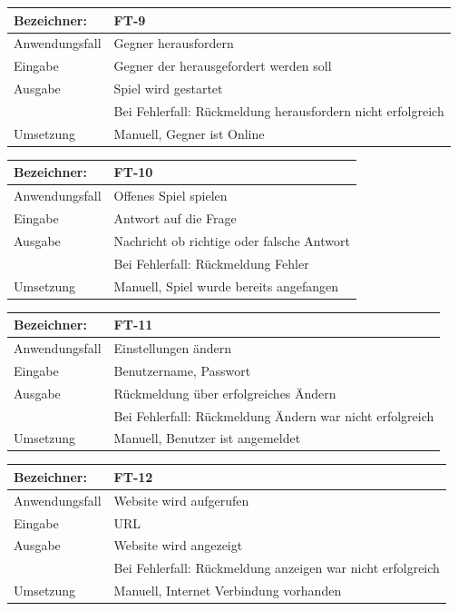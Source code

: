 \documentclass[fontsize=12pt,paper=a4,twoside]{scrartcl}
\begin{document}
\begin{tabular}{|l|p{13.75cm}|}
\hline
	Bezeichner: & FT-9\\
\hline
	Anwendungsfall & Gegner herausfordern\\
\hline
	Eingabe & Gegner der herausgefordert werden soll\\
\hline
	Ausgabe & Spiel wird gestartet\\ &
	Bei Fehlerfall: Rückmeldung herausfordern nicht erfolgreich\\
\hline
	Umsetzung & Manuell, Gegner ist Online\\
\hline
\end{tabular}

\begin{tabular}{|l|p{13.75cm}|}
\hline
	Bezeichner: & FT-10\\
\hline
	Anwendungsfall & Offenes Spiel spielen\\
\hline
	Eingabe & Antwort auf die Frage\\
\hline
	Ausgabe & Nachricht ob richtige oder falsche Antwort\\ &
	Bei Fehlerfall: Rückmeldung Fehler\\
\hline
	Umsetzung & Manuell, Spiel wurde bereits angefangen\\
\hline
\end{tabular}

\begin{tabular}{|l|p{13.75cm}|}
\hline
	Bezeichner: & FT-11\\
\hline
	Anwendungsfall & Einstellungen ändern\\
\hline
	Eingabe & Benutzername, Passwort\\
\hline
	Ausgabe & Rückmeldung über erfolgreiches Ändern\\ &
	Bei Fehlerfall: Rückmeldung Ändern war nicht erfolgreich\\
\hline
	Umsetzung & Manuell, Benutzer ist angemeldet\\
\hline
\end{tabular}

\begin{tabular}{|l|p{13.75cm}|}
\hline
	Bezeichner: & FT-12\\
\hline
	Anwendungsfall & Website wird aufgerufen\\
\hline
	Eingabe & URL\\
\hline
	Ausgabe & Website wird angezeigt\\ &
	Bei Fehlerfall: Rückmeldung anzeigen war nicht erfolgreich\\
\hline
	Umsetzung & Manuell, Internet Verbindung vorhanden\\
\hline
\end{tabular}
\end{document}
